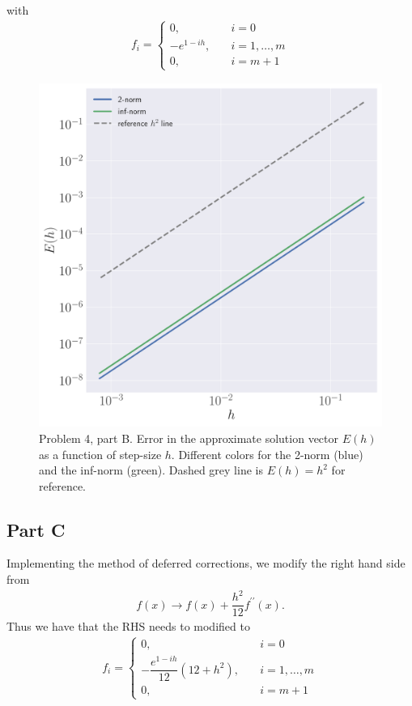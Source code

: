 \documentclass[12pt]{article}
\begin{document}
with
\begin{align}
    f_{i} =
    \begin{cases}
        0,&\quad i = 0\\
        -e^{1-ih},&\quad i=1,\dots,m\\
        0,&\quad i = m+1
    \end{cases}
\end{align}

\begin{figure}[!h]
	\centering
	\includegraphics[clip, scale=0.40]{q4b_fig.pdf}
	\caption{
		Problem 4, part B. Error in the approximate solution vector $E(h)$ as a function of step-size $h$. Different colors for the 2-norm (blue) and the inf-norm (green). Dashed grey line is $E(h) = h^{2}$ for reference.
	}
\end{figure}

\subsection*{Part C}
Implementing the method of deferred corrections, we modify the right hand side from
\begin{align}
    f(x) \to f(x) + \dfrac{h^{2}}{12}f^{\prime\prime}(x).
\end{align}
Thus we have that the RHS needs to modified to
\begin{align}
    f_{i} =
    \begin{cases}
        0,&\quad i = 0\\
        -\dfrac{e^{1-ih}}{12}(12+h^{2}),&\quad i=1,\dots,m\\
        0,&\quad i = m+1
    \end{cases}
\end{align}
\end{document}
